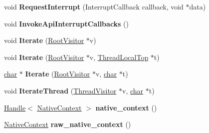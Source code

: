 \begin{DoxyCompactItemize}
void {\bfseries Request\+Interrupt} (Interrupt\+Callback callback, void $\ast$data)
\item 
\mbox{\label{classv8_1_1internal_1_1Isolate_a7161bf0edcf0d50800d5f3e5c7ea8d6b}} 
void {\bfseries Invoke\+Api\+Interrupt\+Callbacks} ()
\item 
\mbox{\label{classv8_1_1internal_1_1Isolate_abd4e817c4b3f3066a84f51f8141defe1}} 
void {\bfseries Iterate} (\mbox{\hyperlink{classv8_1_1internal_1_1RootVisitor}{Root\+Visitor}} $\ast$v)
\item 
\mbox{\label{classv8_1_1internal_1_1Isolate_a20ea93f44955dc7ec8da345cce0bdc40}} 
void {\bfseries Iterate} (\mbox{\hyperlink{classv8_1_1internal_1_1RootVisitor}{Root\+Visitor}} $\ast$v, \mbox{\hyperlink{classv8_1_1internal_1_1ThreadLocalTop}{Thread\+Local\+Top}} $\ast$t)
\item 
\mbox{\label{classv8_1_1internal_1_1Isolate_a8700edd632932a6a370ae517e8b563bd}} 
\mbox{\hyperlink{classchar}{char}} $\ast$ {\bfseries Iterate} (\mbox{\hyperlink{classv8_1_1internal_1_1RootVisitor}{Root\+Visitor}} $\ast$v, \mbox{\hyperlink{classchar}{char}} $\ast$t)
\item 
\mbox{\label{classv8_1_1internal_1_1Isolate_a7bad9f07a0b0ef64f863ed73426c5f3c}} 
void {\bfseries Iterate\+Thread} (\mbox{\hyperlink{classv8_1_1internal_1_1ThreadVisitor}{Thread\+Visitor}} $\ast$v, \mbox{\hyperlink{classchar}{char}} $\ast$t)
\item 
\mbox{\label{classv8_1_1internal_1_1Isolate_a9435d2734e67d1dac0a3ce2a5b9387b8}} 
\mbox{\hyperlink{classv8_1_1internal_1_1Handle}{Handle}}$<$ \mbox{\hyperlink{classv8_1_1internal_1_1NativeContext}{Native\+Context}} $>$ {\bfseries native\+\_\+context} ()
\item 
\mbox{\label{classv8_1_1internal_1_1Isolate_a946d81cf03094968fd8dc02a3d8d9400}} 
\mbox{\hyperlink{classv8_1_1internal_1_1NativeContext}{Native\+Context}} {\bfseries raw\+\_\+native\+\_\+context} ()
\item 
\mbox{\label{classv8_1_1internal_1_1Isolate_ad7f9e1606c0e9f0c7b7cc40448921e10}} 

\end{DoxyCompactItemize}
